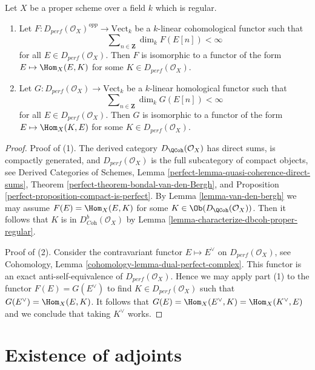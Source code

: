 \begin{lemma}
\label{lemma-bondal-van-den-bergh}
Let $X$ be a proper scheme over a field $k$ which is regular.
\begin{enumerate}
\item Let $F : D_{perf}(\mathcal{O}_X)^{opp} \to \text{Vect}_k$
be a $k$-linear cohomological functor such that
$$
\sum\nolimits_{n \in \mathbf{Z}} \dim_k F(E[n]) < \infty
$$
for all $E \in D_{perf}(\mathcal{O}_X)$. Then $F$ is isomorphic to a functor
of the form $E \mapsto \Hom_X(E, K)$ for some $K \in D_{perf}(\mathcal{O}_X)$.
\item Let $G : D_{perf}(\mathcal{O}_X) \to \text{Vect}_k$
be a $k$-linear homological functor such that
$$
\sum\nolimits_{n \in \mathbf{Z}} \dim_k G(E[n]) < \infty
$$
for all $E \in D_{perf}(\mathcal{O}_X)$. Then $G$ is isomorphic to a functor
of the form $E \mapsto \Hom_X(K, E)$ for some $K \in D_{perf}(\mathcal{O}_X)$.
\end{enumerate}
\end{lemma}

\begin{proof}
Proof of (1). The derived category $D_\QCoh(\mathcal{O}_X)$ has direct sums,
is compactly generated, and $D_{perf}(\mathcal{O}_X)$ is the full subcategory
of compact objects, see
Derived Categories of Schemes, Lemma
\ref{perfect-lemma-quasi-coherence-direct-sums},
Theorem \ref{perfect-theorem-bondal-van-den-Bergh}, and
Proposition \ref{perfect-proposition-compact-is-perfect}.
By Lemma \ref{lemma-van-den-bergh} we may assume
$F(E) = \Hom_X(E, K)$ for some $K \in \Ob(D_\QCoh(\mathcal{O}_X))$.
Then it follows that $K$ is in $D^b_{\textit{Coh}}(\mathcal{O}_X)$
by Lemma \ref{lemma-characterize-dbcoh-proper-regular}.

\medskip\noindent
Proof of (2). Consider the contravariant functor $E \mapsto E^\vee$
on $D_{perf}(\mathcal{O}_X)$, see
Cohomology, Lemma \ref{cohomology-lemma-dual-perfect-complex}.
This functor is an exact anti-self-equivalence of $D_{perf}(\mathcal{O}_X)$.
Hence we may apply part (1) to the functor $F(E) = G(E^\vee)$ to find
$K \in D_{perf}(\mathcal{O}_X)$ such that $G(E^\vee) = \Hom_X(E, K)$.
It follows that $G(E) = \Hom_X(E^\vee, K) = \Hom_X(K^\vee, E)$
and we conclude that taking $K^\vee$ works.
\end{proof}






\section{Existence of adjoints}
\label{section-adjoints}

